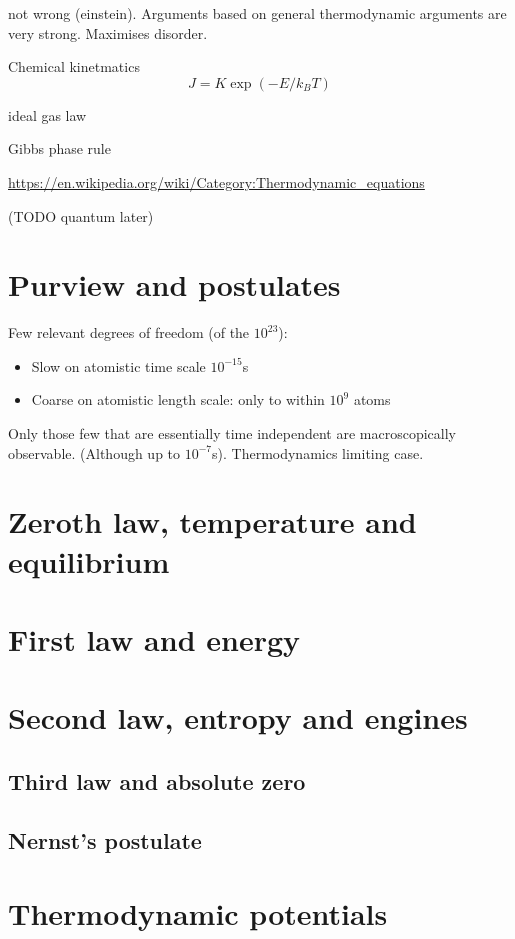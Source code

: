 not wrong (einstein). Arguments based on general thermodynamic arguments are very strong. Maximises disorder.

Chemical kinetmatics
\[ J = K \exp(-E/k_B T) \]

ideal gas law

Gibbs phase rule

\url{https://en.wikipedia.org/wiki/Category:Thermodynamic_equations}

(TODO quantum later)

\chapter{Purview and postulates}
Few relevant degrees of freedom (of the $10^{23}$):
\begin{itemize}
\item Slow on atomistic time scale $10^{-15}$s
\item Coarse on atomistic length scale: only to within $10^9$ atoms
\end{itemize}
Only those few that are essentially time independent are macroscopically observable. (Although up to $10^{-7}$s). Thermodynamics limiting case.

\chapter{Zeroth law, temperature and equilibrium}

\chapter{First law and energy}

\chapter{Second law, entropy and engines}

\section{Third law and absolute zero}
\section{Nernst's postulate}

\chapter{Thermodynamic potentials}

